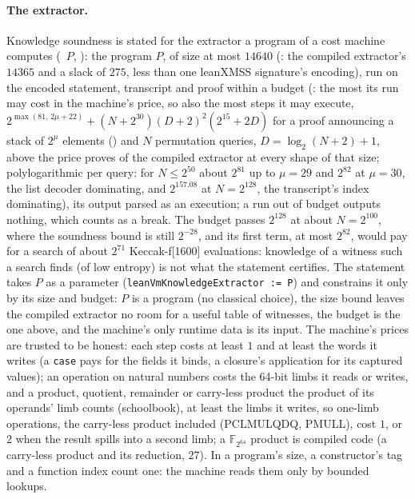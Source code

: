 \documentclass[11pt]{article}
\begin{document}
\paragraph{The extractor.} Knowledge soundness is stated for the extractor a program of a cost
machine computes (~$P$, ): the
program $P$, of size at most $14640$ (: the compiled
extractor's $14365$ and a slack of $275$, less than one leanXMSS signature's encoding), run on the encoded
statement, transcript and proof within a budget (: the most its
run may cost in the machine's price, so also the most steps it may execute,
$2^{\max(81,\,2\mu + 22)} + (N + 2^{30})(D + 2)^2(2^{15} + 2D)$ for a proof announcing a stack of $2^\mu$
elements () and $N$ permutation queries, $D = \log_2(N + 2) + 1$, above the
price  proves of the compiled extractor at every shape of that size; polylogarithmic
per query: for $N \le 2^{50}$ about $2^{81}$ up to $\mu = 29$ and $2^{82}$ at $\mu = 30$, the list
decoder dominating, and $2^{157.08}$ at $N = 2^{128}$, the transcript's index dominating), its output
parsed as an execution; a run out of budget outputs nothing, which counts as a break. The budget
passes $2^{128}$ at about $N = 2^{100}$, where the soundness bound is still $2^{-28}$, and its first
term, at most $2^{82}$, would pay for a search of about $2^{71}$ Keccak-f[1600] evaluations: knowledge
of a witness such a search finds
(of low entropy) is not what the statement certifies. The
statement takes $P$ as a parameter (\texttt{leanVmKnowledgeExtractor := P}) and constrains it only
by its size and budget: $P$ is a program (no classical choice), the size bound leaves the compiled
extractor no room for a useful table of witnesses, the budget is the one above, and the machine's
only runtime data is its input. The machine's prices are trusted to be honest: each step costs at
least $1$ and at least the words it writes (a \texttt{case} pays for the fields it binds, a
closure's application for its captured values); an operation on natural numbers costs the 64-bit
limbs it reads or writes, and a product, quotient, remainder or carry-less product the product of
its operands' limb counts (schoolbook), at least the limbs it writes, so one-limb operations, the
carry-less product included (PCLMULQDQ, PMULL), cost $1$, or $2$ when the result spills into a
second limb; a $\mathbb{F}_{2^{64}}$ product is compiled code (a carry-less product
and its reduction, $27$). In a program's size, a constructor's tag and a function index count one:
the machine reads them only by bounded lookups.
\end{document}
